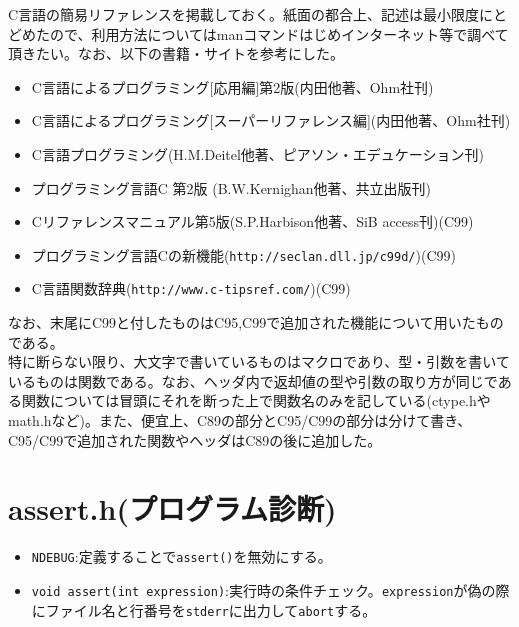 C言語の簡易リファレンスを掲載しておく。紙面の都合上、記述は最小限度にとどめたので、利用方法についてはmanコマンドはじめインターネット等で調べて頂きたい。なお、以下の書籍・サイトを参考にした。
\begin{itemize}
\item C言語によるプログラミング[応用編]第2版(内田他著、Ohm社刊)
\item C言語によるプログラミング[スーパーリファレンス編](内田他著、Ohm社刊)
\item C言語プログラミング(H.M.Deitel他著、ピアソン・エデュケーション刊)
\item プログラミング言語C 第2版 (B.W.Kernighan他著、共立出版刊)
\item Cリファレンスマニュアル第5版(S.P.Harbison他著、SiB access刊)(C99)
\item プログラミング言語Cの新機能(\verb|http://seclan.dll.jp/c99d/|)(C99)
\item C言語関数辞典(\verb|http://www.c-tipsref.com/|)(C99)
\end{itemize}
なお、末尾にC99と付したものはC95,C99で追加された機能について用いたものである。\\

特に断らない限り、大文字で書いているものはマクロであり、型・引数を書いているものは関数である。なお、ヘッダ内で返却値の型や引数の取り方が同じである関数については冒頭にそれを断った上で関数名のみを記している(ctype.hやmath.hなど)。また、便宜上、C89の部分とC95/C99の部分は分けて書き、C95/C99で追加された関数やヘッダはC89の後に追加した。

\section{assert.h(プログラム診断)}
\begin{itemize}
\item \verb|NDEBUG|:定義することで\verb|assert()|を無効にする。
\item \verb|void assert(int expression)|:実行時の条件チェック。\verb|expression|が偽の際にファイル名と行番号を\verb|stderr|に出力して\verb|abort|する。
\end{itemize}
 
